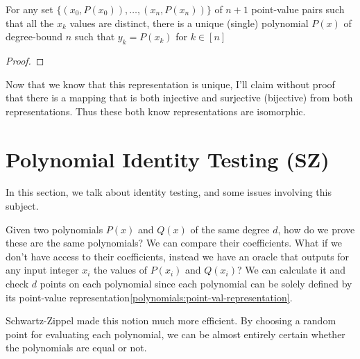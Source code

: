 \begin{theorem}
  For any set \( \{ (x_0,P(x_0)),\dots , (x_{n}, P(x_{n})) \}\) of $n+1$
  point-value pairs such that all the $x_k$ values are distinct,
  there is a unique (single) polynomial $P(x)$ of degree-bound $n$ such that
  $y_k = P(x_k)$ for $k\in[n]$ 
\end{theorem}

\begin{proof}
\end{proof}

Now that we know that this representation is unique, I'll claim without proof that
there is a mapping that is both injective and surjective (bijective) from both representations.
Thus these both know representations are isomorphic.

\section{Polynomial Identity Testing (SZ)}\label{schawtz-zippel}
In this section, we talk about identity testing, 
and some issues involving this subject.

Given two polynomials $P(x)$ and $Q(x)$ of the same degree $d$, 
how do we prove these are the same polynomials? We can compare their coefficients. 
What if we don't have access to their coefficients, instead we have an oracle that outputs for any input integer $x_i$ the values of $P(x_i)$ and $Q(x_i)$?
We can calculate it and check $d$ points on each polynomial 
since each polynomial can be solely defined by its point-value representation\ref{polynomials:point-val-representation}.


Schwartz-Zippel \cite{SZ} made this notion much more efficient.
By choosing a random point for evaluating each polynomial, we can 
be almost entirely certain whether the polynomials are equal or not.

